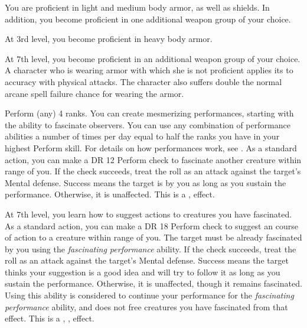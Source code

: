     \featben You are proficient in light and medium body armor, as well as shields.
    In addition, you become proficient in one additional weapon group of your choice.

    At 3rd level, you become proficient in heavy body armor.

    At 7th level, you become proficient in an additional weapon group of your choice.
    A character who is wearing armor with which she is not proficient applies its  to accuracy with physical attacks.
    The character also suffers double the normal arcane spell failure chance for wearing the armor.

    \featpre Perform (any) 4 ranks.
    \featben You can create mesmerizing performances, starting with the ability to fascinate observers.
    You can use any combination of performance abilities a number of times per day equal to half the ranks you have in your highest Perform skill.
    For details on how performances work, see .
    \featben As a standard action, you can make a DR 12 Perform check to fascinate another creature within \rngmed range of you.
    If the check succeeds, treat the roll as an attack against the target's Mental defense.
    Success means the target is \fascinated by you as long as you sustain the performance.
    Otherwise, it is unaffected.
    This is a ,  effect.

    At 7th level, you learn how to suggest actions to creatures you have fascinated.
    As a standard action, you can make a DR 18 Perform check to suggest an course of action to a creature within \rngmed range of you.
    The target must be already fascinated by you using the \textit{fascinating performance} ability.
    If the check succeeds, treat the roll as an attack against the target's Mental defense.
    Success means the target thinks your suggestion is a good idea and will try to follow it as long as you sustain the performance.
    Otherwise, it is unaffected, though it remains fascinated.
    Using this ability is considered to continue your performance for the \textit{fascinating performance} ability, and does not free creatures you have fascinated from that effect.
    This is a , ,  effect.

